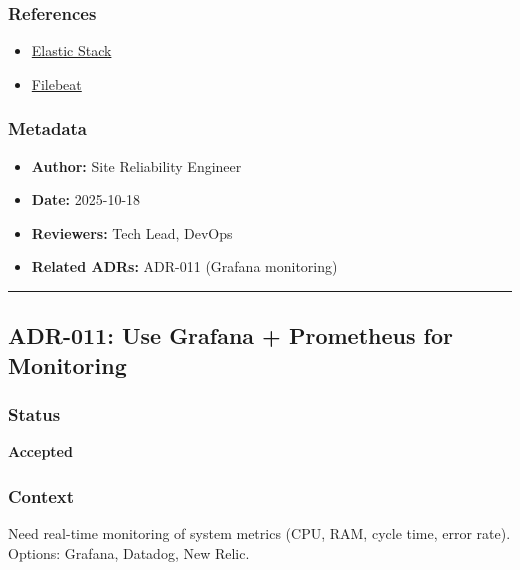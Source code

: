 \documentclass[
]{article}
\providecommand{\tightlist}{%
  \setlength{\itemsep}{0pt}\setlength{\parskip}{0pt}}
\begin{document}
\hypertarget{references-9}{%
\subsubsection{References}\label{references-9}}

\begin{itemize}
\tightlist
\item
  \href{https://www.elastic.co/elastic-stack}{Elastic Stack}
\item
  \href{https://www.elastic.co/beats/filebeat}{Filebeat}
\end{itemize}

\hypertarget{metadata-9}{%
\subsubsection{Metadata}\label{metadata-9}}

\begin{itemize}
\tightlist
\item
  \textbf{Author:} Site Reliability Engineer
\item
  \textbf{Date:} 2025-10-18
\item
  \textbf{Reviewers:} Tech Lead, DevOps
\item
  \textbf{Related ADRs:} ADR-011 (Grafana monitoring)
\end{itemize}

\begin{center}\rule{0.5\linewidth}{0.5pt}\end{center}

\hypertarget{adr-011-use-grafana-prometheus-for-monitoring}{%
\subsection{ADR-011: Use Grafana + Prometheus for
Monitoring}\label{adr-011-use-grafana-prometheus-for-monitoring}}

\hypertarget{status-10}{%
\subsubsection{Status}\label{status-10}}

\textbf{Accepted}

\hypertarget{context-10}{%
\subsubsection{Context}\label{context-10}}

Need real-time monitoring of system metrics (CPU, RAM, cycle time, error
rate). Options: Grafana, Datadog, New Relic.
\end{document}
